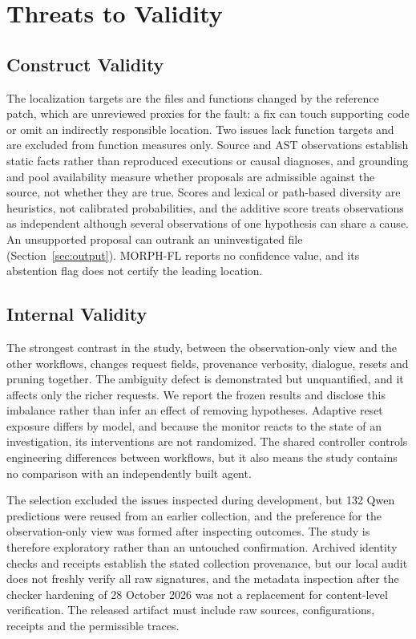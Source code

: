 \documentclass[a4paper,fleqn]{cas-sc}
\newcommand{\tool}{MORPH-FL}
\begin{document}
\section{Threats to Validity}\label{sec:threats}
\subsection{Construct Validity}
The localization targets are the files and functions changed by the reference patch, which are unreviewed proxies for the fault: a fix can touch supporting code or omit an indirectly responsible location. Two issues lack function targets and are excluded from function measures only. Source and AST observations establish static facts rather than reproduced executions or causal diagnoses, and grounding and pool availability measure whether proposals are admissible against the source, not whether they are true. Scores and lexical or path-based diversity are heuristics, not calibrated probabilities, and the additive score treats observations as independent although several observations of one hypothesis can share a cause. An unsupported proposal can outrank an uninvestigated file (Section~\ref{sec:output}). \tool{} reports no confidence value, and its abstention flag does not certify the leading location.

\subsection{Internal Validity}
The strongest contrast in the study, between the observation-only view and the other workflows, changes request fields, provenance verbosity, dialogue, resets and pruning together. The ambiguity defect is demonstrated but unquantified, and it affects only the richer requests. We report the frozen results and disclose this imbalance rather than infer an effect of removing hypotheses. Adaptive reset exposure differs by model, and because the monitor reacts to the state of an investigation, its interventions are not randomized. The shared controller controls engineering differences between workflows, but it also means the study contains no comparison with an independently built agent.

The selection excluded the issues inspected during development, but 132 Qwen predictions were reused from an earlier collection, and the preference for the observation-only view was formed after inspecting outcomes. The study is therefore exploratory rather than an untouched confirmation. Archived identity checks and receipts establish the stated collection provenance, but our local audit does not freshly verify all raw signatures, and the metadata inspection after the checker hardening of 28 October 2026 was not a replacement for content-level verification. The released artifact must include raw sources, configurations, receipts and the permissible traces.
\end{document}

